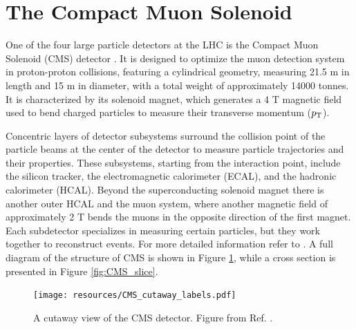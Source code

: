 \section{The Compact Muon Solenoid}\label{sec:CMS}

One of the four large particle detectors at the LHC is the Compact Muon Solenoid (CMS) detector \cite{CMS:1994hea, CMS:2008xjf}. It is designed to optimize the muon detection system in proton-proton collisions, featuring a cylindrical geometry, measuring 21.5 m in length and 15 m in diameter, with a total weight of approximately 14000 tonnes. It is characterized by its solenoid magnet, which generates a 4 T magnetic field used to bend charged particles to measure their transverse momentum ($p_\text{T}$).

Concentric layers of detector subsystems surround the collision point of the particle beams at the center of the detector to measure particle trajectories and their properties. These subsystems, starting from the interaction point, include the silicon tracker, the electromagnetic calorimeter (ECAL), and the hadronic calorimeter (HCAL). Beyond the superconducting solenoid magnet there is another outer HCAL and the muon system, where another magnetic field of approximately 2 T bends the muons in the opposite direction of the first magnet. Each subdetector specializes in measuring certain particles, but they work together to reconstruct events. For more detailed information refer to \cite{CMS:2006myw}. A full diagram of the structure of CMS is shown in Figure \ref{fig:CMS_cutaway}, while a cross section is presented in Figure \ref{fig:CMS_slice}.

\begin{figure}[!ht]
    \vspace*{-0.0cm}
    \centering
    \setlength{\mylength}{\textwidth}
    \texttt{[image: resources/CMS\_cutaway\_labels.pdf]}
    \vspace*{-0.0cm}
    \caption{A cutaway view of the CMS detector. Figure from Ref. \cite{Sakuma:2013jqa}.}
    \label{fig:CMS_cutaway}
    \vspace*{-0.3cm}
\end{figure}

